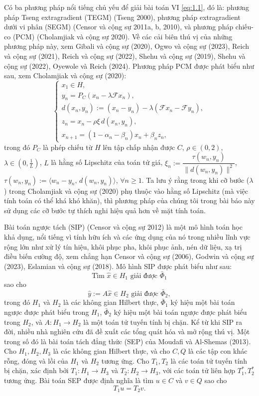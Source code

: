 \documentclass{MyBook}
\theoremstyle{plain}
\theoremstyle{definition}
\theoremstyle{remark}
\numberwithin{equation}{chapter}
\newcommand{\Fc}{\mathcal{F}}
\newcommand{\inp}[2]{\langle #1,\,#2\rangle}
\newcommand{\nm}[1]{\lVert #1\rVert}
\begin{document}
Có ba phương pháp nổi tiếng chủ yếu để giải bài toán VI \eqref{eq:1.1}, đó là: phương pháp Tseng extragradient (TEGM) (Tseng 2000), phương pháp extragradient dưới vi phân (SEGM) (Censor và cộng sự 2011a, b, 2010), và phương pháp chiếu-co (PCM) (Cholamjiak và cộng sự 2020). Về các cải biên thú vị của những phương pháp này, xem Gibali và cộng sự (2020), Ogwo và cộng sự (2023), Reich và cộng sự (2021), Reich và cộng sự (2022), Shehu và cộng sự (2019), Shehu và cộng sự (2022), Oyewole và Reich (2024). Phương pháp PCM được phát biểu như sau, xem Cholamjiak và cộng sự (2020):
\[
\begin{cases}
x_1\in H,\\
y_n = P_C(x_n-\lambda \Fc x_n),\\
d(x_n,y_n) := (x_n-y_n)-\lambda(\Fc x_n-\Fc y_n),\\
z_n = x_n-\rho\xi\, d(x_n,y_n),\\
x_{n+1} = (1-\alpha_n-\beta_n)x_n+\beta_n z_n,
\end{cases}
\]
trong đó $P_C$ là phép chiếu từ $H$ lên tập chấp nhận được $C$, $\rho\in(0,2)$, $\lambda\in(0,\tfrac{1}{L})$, $L$ là hằng số Lipschitz của toán tử giá, $\xi_n:=\dfrac{\tau(w_n,y_n)}{\nm{d(w_n,y_n)}^2}$, $\tau(w_n,y_n):=\inp{w_n-y_n}{d(w_n,y_n)}$, $\forall n\ge 1$. Ta lưu ý rằng trong khi cỡ bước ($\lambda$) trong Cholamjiak và cộng sự (2020) phụ thuộc vào hằng số Lipschitz (mà việc tính toán có thể khá khó khăn), thì phương pháp của chúng tôi trong bài báo này sử dụng các cỡ bước tự thích nghi hiệu quả hơn về mặt tính toán.

Bài toán ngược tách (SIP) (Censor và cộng sự 2012) là một mô hình toán học khả dụng, nổi tiếng vì tính hữu ích và các ứng dụng của nó trong nhiều lĩnh vực rộng lớn như xử lý tín hiệu, khôi phục pha, khôi phục ảnh, nén dữ liệu, xạ trị điều biến cường độ, xem chẳng hạn Censor và cộng sự (2006), Godwin và cộng sự (2023), Eslamian và cộng sự (2018). Mô hình SIP được phát biểu như sau:
\begin{equation}
\text{Tìm } \hat{x}\in H_1 \text{ giải được } \bar{\Phi}_1
\end{equation}
sao cho
\begin{equation}
\hat{y} := A\hat{x}\in H_2 \text{ giải được } \bar{\Phi}_2,
\end{equation}
trong đó $H_1$ và $H_2$ là các không gian Hilbert thực, $\bar{\Phi}_1$ ký hiệu một bài toán ngược được phát biểu trong $H_1$, $\bar{\Phi}_2$ ký hiệu một bài toán ngược được phát biểu trong $H_2$, và $A:H_1\to H_2$ là một toán tử tuyến tính bị chặn. Kể từ khi SIP ra đời, nhiều nhà nghiên cứu đã đề xuất các tổng quát hóa và mở rộng thú vị. Một trong số đó là bài toán tách đẳng thức (SEP) của Moudafi và Al-Shemas (2013). Cho $H_1,H_2,H_3$ là các không gian Hilbert thực, và cho $C,Q$ là các tập con khác rỗng, đóng và lồi của $H_1$ và $H_2$ tương ứng. Cho $T_1,T_2$ là các toán tử tuyến tính bị chặn, xác định bởi $T_1:H_1\to H_3$ và $T_2:H_2\to H_3$, với các toán tử liên hợp $T_1^{*},T_2^{*}$ tương ứng. Bài toán SEP được định nghĩa là tìm $u\in C$ và $v\in Q$ sao cho
\begin{equation}
T_1u = T_2v. \label{eq:1.4}
\end{equation}
\end{document}
